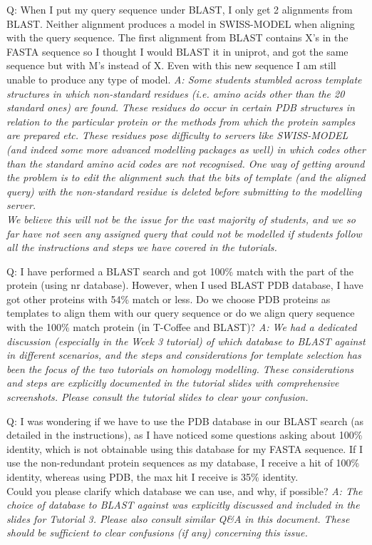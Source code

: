 \documentclass[10pt,a4paper]{article}
\begin{document}
Q: When I put my query sequence under BLAST, I only get 2 alignments from BLAST. Neither alignment produces a model in SWISS-MODEL when aligning with the query sequence. The first alignment from BLAST contains X's in the FASTA sequence so I thought I would BLAST it in uniprot, and got the same sequence but with M's instead of X. Even with this new sequence I am still unable to produce any type of model. \newline
\textit{A: Some students stumbled across template structures in which non-standard residues (i.e. amino acids other than the 20 standard ones) are found. These residues do occur in certain PDB structures in relation to the particular protein or the methods from which the protein samples are prepared etc. These residues pose difficulty to servers like SWISS-MODEL (and indeed some more advanced modelling packages as well) in which codes other than the standard amino acid codes are not recognised. One way of getting around the problem is to edit the alignment such that the bits of template (and the aligned query) with the non-standard residue is deleted before submitting to the modelling server. \\
We believe this will not be the issue for the vast majority of students, and we so far have not seen any assigned query that could not be modelled if students follow all the instructions and steps we have covered in the tutorials.}  \newline


Q: I have performed a BLAST search and got 100\% match with the part of the protein (using nr database). However, when I used BLAST PDB database, I have got other proteins with 54\% match or less. Do we choose PDB proteins as templates to align them with our query sequence or do we align query sequence with the 100\% match protein (in T-Coffee and BLAST)? \newline
\textit{A: We had a dedicated discussion (especially in the Week 3 tutorial) of which database to BLAST against in different scenarios, and the steps and considerations for template selection has been the focus of the two tutorials on homology modelling. These considerations and steps are explicitly documented in the tutorial slides with comprehensive screenshots. Please consult the tutorial slides to clear your confusion.} \newline 

Q: I was wondering if we have to use the PDB database in our BLAST search (as detailed in the instructions), as I have noticed some questions asking about 100\% identity, which is not obtainable using this database for my FASTA sequence. If I use the non-redundant protein sequences as my database, I receive a hit of 100\% identity, whereas using PDB, the max hit I receive is 35\% identity. \\ Could you please clarify which database we can use, and why, if possible? \newline
\textit{A: The choice of database to BLAST against was explicitly discussed and included in the slides for Tutorial 3. Please also consult similar Q\&A in this document. These should be sufficient to clear confusions (if any) concerning this issue.} \newline
\end{document}
